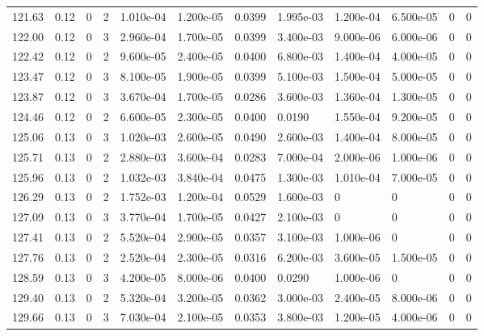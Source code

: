 \documentclass[preview]{standalone}
\begin{document}
{{{{{{\begin{tabular}{L{1.2cm}C{1.2cm} C{0.3cm}C{0.5cm} C{1.4cm}C{1.4cm} C{1.4cm}C{1.4cm} C{1.6cm}C{1.6cm} C{1.6cm}C{1.6cm}}
  121.63  &  0.12  & 0     &  2 &  1.010e-04  & 1.200e-05  &  0.0399&   1.995e-03& 1.200e-04 & 6.500e-05   &  0 & 0  \\ 
  122.00  &  0.12  & 0     &  3 &  2.960e-04  & 1.700e-05  &  0.0399&   3.400e-03& 9.000e-06 & 6.000e-06   &  0 & 0  \\ 
  122.42  &  0.12  & 0     &  2 &  9.600e-05  & 2.400e-05  &  0.0400&   6.800e-03& 1.400e-04 & 4.000e-05   &  0 & 0  \\ 
  123.47  &  0.12  & 0     &  3 &  8.100e-05  & 1.900e-05  &  0.0399&   5.100e-03& 1.500e-04 & 5.000e-05   &  0 & 0  \\ 
  123.87  &  0.12  & 0     &  3 &  3.670e-04  & 1.700e-05  &  0.0286&   3.600e-03& 1.360e-04 & 1.300e-05   &  0 & 0  \\ 
  124.46  &  0.12  & 0     &  2 &  6.600e-05  & 2.300e-05  &  0.0400&   0.0190& 1.550e-04 & 9.200e-05   &  0 & 0  \\ 
  125.06  &  0.13  & 0     &  3 &  1.020e-03  & 2.600e-05  &  0.0490&   2.600e-03& 1.400e-04 & 8.000e-05   &  0 & 0  \\ 
  125.71  &  0.13  & 0     &  2 &  2.880e-03  & 3.600e-04  &  0.0283&   7.000e-04& 2.000e-06 & 1.000e-06   &  0 & 0  \\ 
  125.96  &  0.13  & 0     &  2 &  1.032e-03  & 3.840e-04  &  0.0475&   1.300e-03& 1.010e-04 & 7.000e-05   &  0 & 0  \\ 
  126.29  &  0.13  & 0     &  2 &  1.752e-03  & 1.200e-04  &  0.0529&   1.600e-03& 0 & 0   &  0 & 0  \\ 
  127.09  &  0.13  & 0     &  3 &  3.770e-04  & 1.700e-05  &  0.0427&   2.100e-03& 0 & 0   &  0 & 0  \\ 
  127.41  &  0.13  & 0     &  2 &  5.520e-04  & 2.900e-05  &  0.0357&   3.100e-03& 1.000e-06 & 0   &  0 & 0  \\ 
  127.76  &  0.13  & 0     &  2 &  2.520e-04  & 2.300e-05  &  0.0316&   6.200e-03& 3.600e-05 & 1.500e-05   &  0 & 0  \\ 
  128.59  &  0.13  & 0     &  3 &  4.200e-05  & 8.000e-06  &  0.0400&   0.0290& 1.000e-06 & 0   &  0 & 0  \\ 
  129.40  &  0.13  & 0     &  2 &  5.320e-04  & 3.200e-05  &  0.0362&   3.000e-03& 2.400e-05 & 8.000e-06   &  0 & 0  \\ 
  129.66  &  0.13  & 0     &  3 &  7.030e-04  & 2.100e-05  &  0.0353&   3.800e-03& 1.200e-05 & 4.000e-06   &  0 & 0  \\ 
\hline 
\end{tabular} 

}}}}}}
\end{document}
